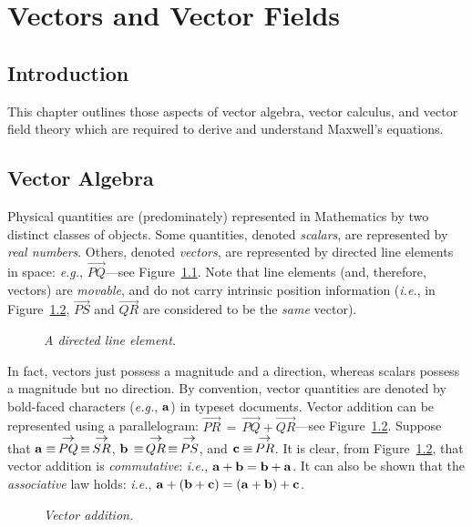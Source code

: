 \chapter{Vectors and Vector Fields}\label{vector}
\section{Introduction}
This chapter outlines those aspects of vector algebra, vector calculus, and
vector field theory which are required to derive and understand Maxwell's equations. 

\section{Vector Algebra}
Physical quantities are (predominately) represented in Mathematics by two distinct classes
of objects. Some quantities, denoted {\em scalars}, are represented by {\em real
numbers}. Others, denoted {\em vectors}, are represented by 
 directed line elements in space: {\em e.g.},
$\stackrel{\displaystyle \rightarrow}{PQ}$---see Figure~\ref{fig1}.
 Note that line elements
(and, therefore, vectors) are {\em movable}, and do not carry intrinsic position information ({\em i.e.}, in Figure~\ref{fig2}, $\stackrel{\displaystyle \rightarrow}{PS}$
and $\stackrel{\displaystyle \rightarrow}{QR}$ are considered to be the
{\em same}\/ vector).
\begin{figure}
\epsfysize=1.25in
\centerline{}
\caption{\em A directed line element.}\label{fig1}
\end{figure}
In fact, vectors just possess a magnitude and a direction, whereas scalars possess
a magnitude but no direction.
By convention, vector quantities are denoted by bold-faced characters ({\em e.g.},
${\bf a}$) in 
typeset documents. 
Vector addition
can be represented using a parallelogram: $\stackrel{\displaystyle \rightarrow}{PR}
\,=\,
\stackrel{\displaystyle \rightarrow}{PQ}+ \stackrel{\displaystyle \rightarrow}{QR}$---see Figure~\ref{fig2}.
Suppose that ${\bf a}\equiv  \,\stackrel{\displaystyle \rightarrow}{PQ}\,\equiv\,\stackrel{\displaystyle \rightarrow}{SR}$,
${\bf b} \,\equiv \,\stackrel{\displaystyle \rightarrow}{QR}\,\equiv
\,\stackrel{\displaystyle \rightarrow}{PS}$, and ${\bf c} \equiv
 \,\stackrel{\displaystyle \rightarrow}{PR}$. It is clear,
from Figure~\ref{fig2}, that vector addition is
{\em commutative}: {\em i.e.}, ${\bf a} + {\bf b} = {\bf b}+{\bf a}$. It can also
be shown that the {\em associative} law  holds: {\em i.e.}, ${\bf a} +
 ({\bf b} + {\bf c}) = ({\bf a} + {\bf b}) + {\bf c}$.
\begin{figure}
\centerline{}
\caption{\em Vector addition.}\label{fig2}
\end{figure}

